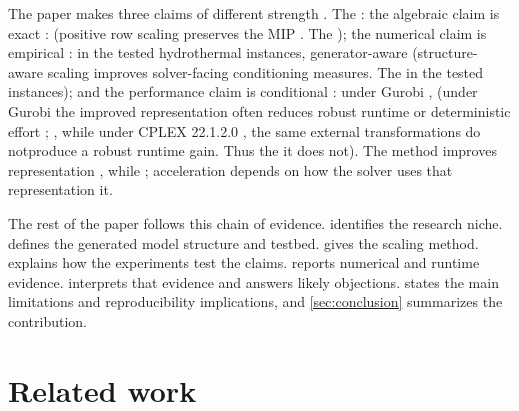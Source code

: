 \documentclass[AMA,Times1COL]{WileyNJDv5} %
\providecommand{\DIFadd}[1]{{\protect\color{blue} \sf #1}} %
\providecommand{\DIFdel}[1]{{\protect\color{red} \scriptsize #1}} %
\providecommand{\DIFaddbegin}{} %
\providecommand{\DIFaddend}{} %
\providecommand{\DIFdelbegin}{} %
\providecommand{\DIFdelend}{} %
\begin{document}
The paper makes three claims of different strength\DIFdelbegin \DIFdel{. The }\DIFdelend \DIFaddbegin \DIFadd{: the }\DIFaddend algebraic claim is exact \DIFdelbegin \DIFdel{: }\DIFdelend \DIFaddbegin \DIFadd{(}\DIFaddend positive row
scaling preserves the MIP\DIFdelbegin \DIFdel{. The }\DIFdelend \DIFaddbegin \DIFadd{); the }\DIFaddend numerical claim is empirical \DIFdelbegin \DIFdel{: in the tested hydrothermal instances, generator-aware }\DIFdelend \DIFaddbegin \DIFadd{(structure-aware }\DIFaddend scaling improves
solver-facing conditioning \DIFdelbegin \DIFdel{measures. The }\DIFdelend \DIFaddbegin \DIFadd{in the tested instances); and the }\DIFaddend performance claim is conditional
\DIFdelbegin \DIFdel{: under Gurobi , }\DIFdelend \DIFaddbegin \DIFadd{(under Gurobi }\DIFaddend the improved representation often reduces robust runtime or deterministic effort\DIFdelbegin \DIFdel{; }\DIFdelend \DIFaddbegin \DIFadd{,
while }\DIFaddend under CPLEX 22.1.2.0 \DIFdelbegin \DIFdel{, the same external transformations do notproduce a robust runtime gain. Thus the }\DIFdelend \DIFaddbegin \DIFadd{it does not). The }\DIFaddend method improves representation\DIFdelbegin \DIFdel{, while }\DIFdelend \DIFaddbegin \DIFadd{; }\DIFaddend acceleration depends
on how the solver uses \DIFdelbegin \DIFdel{that representation}\DIFdelend \DIFaddbegin \DIFadd{it}\DIFaddend .

The rest of the paper follows this chain of evidence.  identifies
the research niche.  defines the generated model structure and testbed.
 gives the scaling method.  explains how
the experiments test the claims.  reports numerical and runtime
evidence.  interprets that evidence and answers likely objections.
 states the main limitations and reproducibility implications, and
\cref{sec:conclusion} summarizes the contribution.

\section{Related work}
\label{sec:related-work}
\end{document}
